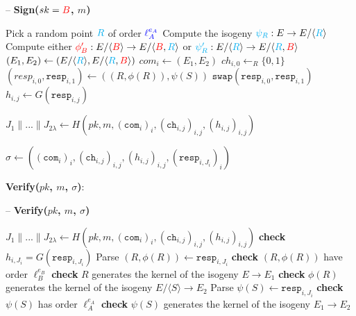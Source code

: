 \begin{algorithm}
\caption{-- \textbf{Sign($sk = \textcolor{red}{B}$, $m$)}}\label{euclid}
\begin{algorithmic}[1]
	\State Pick a random point $\textcolor{cyan}{R}$ of order $\textcolor{blue}{\ell_{A}^{e_A}}$
	\State Compute the isogeny $\textcolor{cyan}{\psi_R}: E \rightarrow E/\langle \textcolor{cyan}{R} \rangle$
	\State Compute either $\textcolor{red}{\phi'_B} : E/\langle \textcolor{red}{B} \rangle \rightarrow E/\langle \textcolor{red}{B},\textcolor{cyan}{R} \rangle$ or $\textcolor{cyan}{\psi'_R} : E/\langle \textcolor{cyan}{R} \rangle \rightarrow E/\langle \textcolor{cyan}{R},\textcolor{red}{B} \rangle$
	\State $(E_{1},E_{2}) \gets (E/\langle \textcolor{cyan}{R} \rangle, E/\langle \textcolor{cyan}{R},\textcolor{red}{B} \rangle)$
	\State $com_{i} \gets (E_{1}, E_{2})$
	\State $ch_{i,0} \gets_{R} \{0,1\}$
	\State $(resp_{i,0}, \texttt{resp}_{i,1}) \gets ((R,\phi(R)), \psi(S))$
		\State $\texttt{swap}(\texttt{resp}_{i,0},\texttt{resp}_{i,1})$
	\EndIf
	\State $h_{i,j} \gets G(\texttt{resp}_{i,j})$
\EndFor

\State $J_{1} \parallel ... \parallel J_{2\lambda} \gets H(pk, m, (\texttt{com}_{i})_{i},(\texttt{ch}_{i,j})_{i,j},(h_{i,j})_{i,j})$

\State \Return $\sigma \gets ((\texttt{com}_{i})_{i}, (\texttt{ch}_{i,j})_{i,j}, (h_{i,j})_{i,j}, (\texttt{resp}_{i,J_{i}})_{i})$
\end{algorithmic}
\end{algorithm}

\noindent
\textbf{Verify($pk$, $m$, $\sigma$)}:\\

\begin{algorithm}[H]
\caption{-- \textbf{Verify($pk$, $m$, $\sigma$)}}\label{euclid}
\begin{algorithmic}[1]
\State $J_{1} \parallel ... \parallel J_{2\lambda} \gets H(pk, m, (\texttt{com}_{i})_{i},(\texttt{ch}_{i,j})_{i,j},(h_{i,j})_{i,j})$
	\State \textbf{check} $h_{i,J_{i}} = G(\texttt{resp}_{i,J_{i}})$
		\State Parse $(R,\phi(R)) \gets \texttt{resp}_{i,J_{i}}$
		\State \textbf{check} $(R, \phi(R))$ have order $\ell^{e_{B}}_{B}$
		\State \textbf{check} $R$ generates the kernel of the isogeny $E \rightarrow E_{1}$
		\State \textbf{check} $\phi(R)$ generates the kernel of the isogeny $E/\langle S \rangle \rightarrow E_{2}$
	\Else
		\State Parse $\psi(S) \gets \texttt{resp}_{i,J_{i}}$
		\State \textbf{check} $\psi(S)$ has order $\ell^{e_{A}}_{A}$
		\State \textbf{check} $\psi(S)$ generates the kernel of the isogeny $E_{1} \rightarrow E_{2}$
	\EndIf
\EndFor

	\State {}
\Else
	\State {}
\EndIf
\end{algorithmic}
\end{algorithm}

